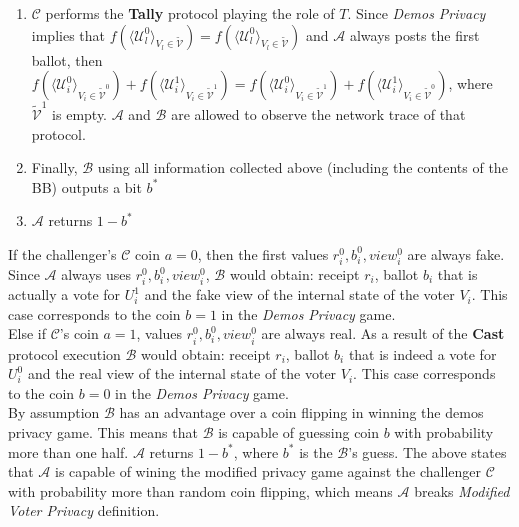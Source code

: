 \documentclass[12pt]{article}
\begin{document}
\begin{enumerate}
\begin{enumerate}
\item $\mathcal{C}$ performs the \textbf{Tally} protocol playing the role of $T$. Since \textit{Demos Privacy} implies that  $f(\langle \mathcal{U}^0_l \rangle _{V_l \in \tilde{\mathcal{V}}} ) = f(\langle \mathcal{U}^0_l \rangle _{V_l \in \tilde{\mathcal{V}}})$ and  $\mathcal{A}$ always posts the first ballot, then  $f(\langle \mathcal{U}^0_i \rangle _{V_i \in \tilde{\mathcal{V}}^0} ) + f(\langle \mathcal{U}^1_i \rangle _{V_i \in \tilde{\mathcal{V}}^1} ) =  f(\langle \mathcal{U}^0_i \rangle _{V_i \in \tilde{\mathcal{V}}^1} ) +  f(\langle \mathcal{U}^1_i \rangle _{V_i \in \tilde{\mathcal{V}}^0} )$, where $\tilde{\mathcal{V}}^1$ is empty.  $\mathcal{A}$ and  $\mathcal{B}$ are allowed to observe the network trace of that protocol. 
\item Finally, $\mathcal{B}$ using all information collected above (including the contents of the BB) outputs a bit $b^*$
\item $\mathcal{A}$ returns $1 - b^*$
 \end{enumerate} 
  \end{enumerate} 
 
If the challenger's  $\mathcal{C}$ coin $a=0$, then the first values $r^0_i,b_i^0,view_i^0$ are always fake. Since $\mathcal{A}$ always uses $r^0_i,b_i^0,view_i^0$, $\mathcal{B}$ would obtain: receipt $r_i$, ballot $b_i$ that is actually a vote for $U^1_i$  and the fake view of the internal state of the voter $V_i$. This case corresponds to the coin $b=1$ in the \textit{Demos Privacy} game. \\

Else if $\mathcal{C}$'s coin $a=1$, values $r^0_i,b_i^0,view_i^0$ are always real. As a result of the \textbf{Cast}  protocol execution $\mathcal{B}$ would obtain: receipt $r_i$, ballot $b_i$ that is indeed a vote for $U^0_i$  and the real view of the internal state of the voter $V_i$. This case corresponds to the coin $b=0$ in the \textit{Demos Privacy} game.\\
 
By assumption $\mathcal{B}$ has an advantage over a coin flipping in winning the demos privacy game. This means that  $\mathcal{B}$ is capable of guessing coin $b$ with probability more than one half.  $\mathcal{A}$ returns $1-b^*$, where $b^*$ is the $\mathcal{B}$'s guess. The above states that $\mathcal{A}$ is capable of wining the modified privacy game against  the challenger $\mathcal{C}$ with probability more than random coin flipping, which means $\mathcal{A}$ breaks \textit{Modified Voter Privacy} definition.\\ 
\end{document}
